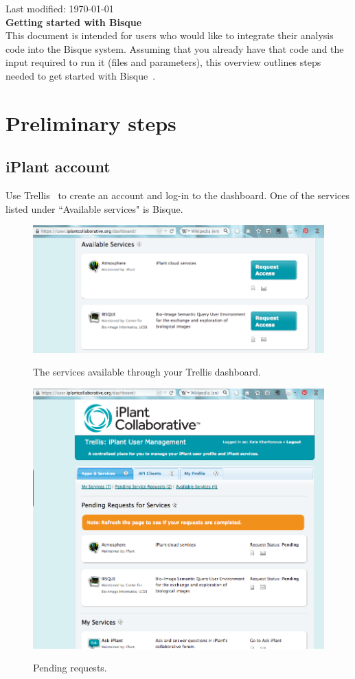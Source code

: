 \documentclass[12pt]{article}
\begin{document}

\hfill Last modified: \today \\%

\noindent
{\Large \bf Getting started with Bisque}\\ 

This document is intended for users who would like to integrate their analysis code into the Bisque system.
Assuming that you already have that code and the input  required to run it (files and parameters), this overview
outlines steps needed to get started with Bisque~\cite{Bisque}.

\setcounter{section}{-1} %
\section{Preliminary steps}
\label{sec:Preliminary}
\subsection{iPlant account}
\label{sec:iPlant_account}

Use Trellis~\cite{Trellis}
to create an account and log-in to the dashboard.
One of the services listed under ``Available services" is Bisque.

\begin{figure}[h]
\centering
  \includegraphics[width=0.6\linewidth]{./figures/available_services.png}
  \label{fig:available_services}
  \caption{The services available through your Trellis dashboard.}
\end{figure}

\begin{figure}[h]
\centering
  \includegraphics[width=0.6\linewidth]{./figures/pending_request.png}
  \label{fig:pending_request}
  \caption{Pending requests.}
\end{figure}
\end{document}
